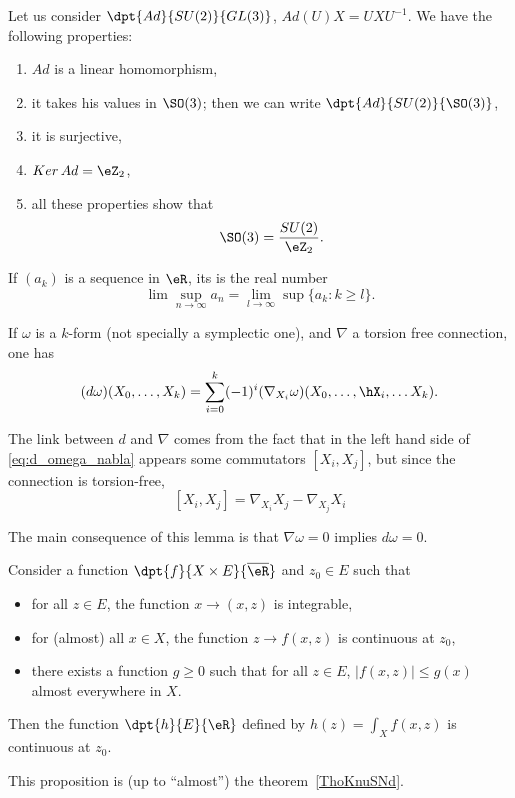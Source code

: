 \begin{theorem} \label{1503t1}
Let us consider $\dpt{Ad}{SU(2)}{GL(3)}$, $Ad(U)X=UXU^{-1}$. We have the following properties:

\begin{enumerate}
\item $Ad$ is a linear homomorphism,
\item it takes his values in $\SO(3)$; then we can write $\dpt{Ad}{SU(2)}{\SO(3)}$,
\item it is surjective,
\item $Ker\,Ad=\eZ_2$,
\item all these properties show that \[\SO(3)=\frac{SU(2)}{\eZ_2}.\]
\end{enumerate}
\end{theorem}

\begin{definition}
If $(a_k)$ is a sequence in $\eR$, its  is the real number
\[
  \lim\sup_{n\to\infty}a_n=\lim_{l\to\infty}\sup\{a_k:k\geq l\}.
\]
\end{definition}

\begin{lemma}
If $\omega$ is a $k$-form (not specially a symplectic one), and $\nabla$ a torsion free connection, one has
\begin{equation}\label{eq:d_omega_nabla}
  (d\omega)(X_0,\ldots,X_k)=\sum_{i=0}^k (-1)^i(\nabla_{X_i}\omega)(X_0,\ldots,\hX_i,\ldots X_k).
\end{equation}
\end{lemma}

\begin{remark}
The link between $d$ and $\nabla$ comes from the fact that in the left hand side of \eqref{eq:d_omega_nabla} appears some commutators $[X_i,X_j]$, but since the connection is torsion-free,
\[
  [X_i,X_j]=\nabla_{X_i}X_j-\nabla_{X_j}X_i
\]
\end{remark}
The main consequence of this lemma is that $\nabla\omega=0$ implies $d\omega=0$.

\begin{proposition} \label{prop:fdefint}
    Consider a function $\dpt{f}{X\times E}{\overline{\eR}}$ and $z_0\in E$ such that
    \begin{itemize}
        \item for all $z\in E$, the function $x\to(x,z)$ is integrable,
        \item for (almost) all $x\in X$, the function $z\to f(x,z)$ is continuous at $z_0$,
        \item there exists a function $g\geq 0$ such that for all $z\in E$, $| f(x,z) |\leq g(x)$ almost everywhere in $X$.
    \end{itemize}
    Then the function $\dpt{h}{E}{\eR}$ defined by $h(z)=\int_Xf(x,z)$ is continuous at $z_0$.
\end{proposition}
This proposition is (up to ``almost'') the theorem~\ref{ThoKnuSNd}.

